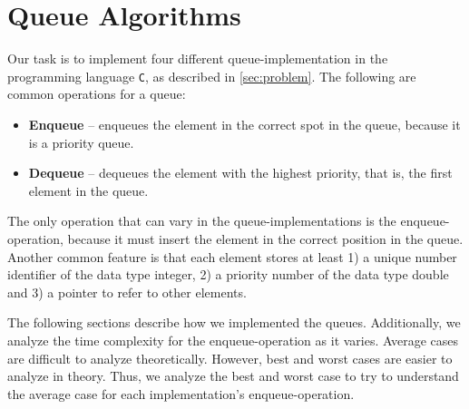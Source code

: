 \documentclass[a4paper,11pt]{kth-mag}
\newcommand*{\skippara}{\par\vspace{\baselineskip} \noindent}
\begin{document}
\section{Queue Algorithms}\label{sec:algorithms}
Our task is to implement four different queue-implementation in the programming language \texttt{C}, as described in \cref{sec:problem}.
The following are common operations for a queue:
\begin{itemize}
    \item \textbf{Enqueue} -- enqueues the element in the correct spot in the queue, because it is a priority queue.
    \item \textbf{Dequeue} -- dequeues the element with the highest priority, that is, the first element in the queue.
\end{itemize}

\skippara The only operation that can vary in the queue-implementations is the enqueue-operation, because it must insert the element in the correct position in the queue.
Another common feature is that each element stores at least 1) a unique number identifier of the data type integer, 2) a priority number of the data type double and 3) a pointer to refer to other elements.

\skippara The following sections describe how we implemented the queues.
Additionally, we analyze the time complexity for the enqueue-operation as it varies.
Average cases are difficult to analyze theoretically.
However, best and worst cases are easier to analyze in theory.
Thus, we analyze the best and worst case to try to understand the average case for each implementation's enqueue-operation.
\end{document}
